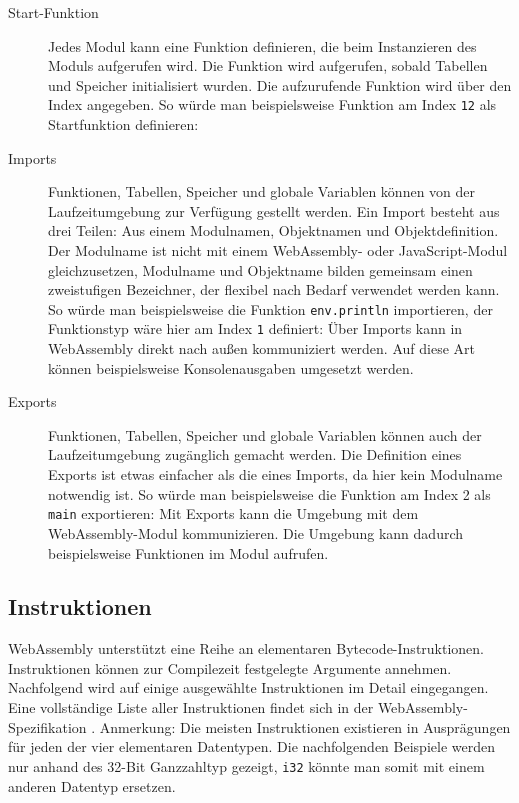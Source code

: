 \begin{description}
    \item[Start-Funktion] Jedes Modul kann eine Funktion definieren, die beim Instanzieren des Moduls aufgerufen wird. Die Funktion wird aufgerufen, sobald Tabellen und Speicher initialisiert wurden. Die aufzurufende Funktion wird über den Index angegeben. So würde man beispielsweise Funktion am Index \lstinline{12} als Startfunktion definieren: 
    \item[Imports] Funktionen, Tabellen, Speicher und globale Variablen können von der Laufzeitumgebung zur Verfügung gestellt werden. Ein Import besteht aus drei Teilen: Aus einem Modulnamen, Objektnamen und Objektdefinition. Der Modulname ist nicht mit einem WebAssembly- oder JavaScript-Modul gleichzusetzen, Modulname und Objektname bilden gemeinsam einen zweistufigen Bezeichner, der flexibel nach Bedarf verwendet werden kann. So würde man beispielsweise die Funktion \lstinline{env.println} importieren, der Funktionstyp wäre hier am Index \lstinline{1} definiert: 
    Über Imports kann in WebAssembly direkt nach außen kommuniziert werden. Auf diese Art können beispielsweise Konsolenausgaben umgesetzt werden.
    \item[Exports] Funktionen, Tabellen, Speicher und globale Variablen können auch der Laufzeitumgebung zugänglich gemacht werden. Die Definition eines Exports ist etwas einfacher als die eines Imports, da hier kein Modulname notwendig ist. So würde man beispielsweise die Funktion am Index 2 als \lstinline{main} exportieren: 
    Mit Exports kann die Umgebung mit dem WebAssembly-Modul kommunizieren. Die Umgebung kann dadurch beispielsweise Funktionen im Modul aufrufen.
\end{description}

\subsection{Instruktionen}
\label{subsec:WebAssembly-Instruktionen}
WebAssembly unterstützt eine Reihe an elementaren Bytecode-Instruktionen. Instruktionen können zur Compilezeit festgelegte Argumente annehmen. Nachfolgend wird auf einige ausgewählte Instruktionen im Detail eingegangen. Eine vollständige Liste aller Instruktionen findet sich in der WebAssembly-Spezifikation \cite{WebAssemblySpecification}. Anmerkung: Die meisten Instruktionen existieren in Ausprägungen für jeden der vier elementaren Datentypen. Die nachfolgenden Beispiele werden nur anhand des 32-Bit Ganzzahltyp gezeigt, \lstinline{i32} könnte man somit mit einem anderen Datentyp ersetzen.

